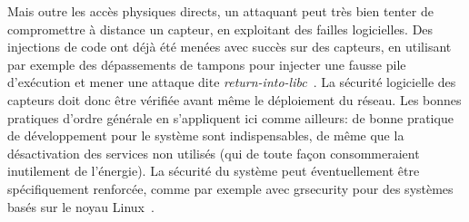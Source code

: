 Mais outre les accès physiques directs, un attaquant peut très bien tenter de compromettre à distance un capteur, en exploitant des failles logicielles.
Des injections de code ont déjà été menées avec succès sur des capteurs, en utilisant par exemple des dépassements de tampons pour injecter une fausse pile d'exécution et mener une attaque dite \textit{return-into-libc}~\cite{FC08}.
La sécurité logicielle des capteurs doit donc être vérifiée avant même le déploiement du réseau.
Les bonnes pratiques d'ordre générale en \secu s'appliquent ici comme ailleurs: de bonne pratique de développement pour le système sont indispensables, de même que la désactivation des services non utilisés (qui de toute façon consommeraient inutilement de l'énergie).
La sécurité du système peut éventuellement être spécifiquement renforcée, comme par exemple avec \mbox{grsecurity} pour des systèmes basés sur le noyau Linux~\cite{GFN11}.

